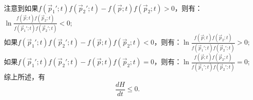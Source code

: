 \documentclass[reqno,a4paper,12pt]{amsart}
\begin{document}
\begin{enumerate}[1.]
\begin{tcolorbox}[breakable, colback = black!5!white, colframe = black]
\begin{align*}
\end{align*}
注意到如果$f(\vec{p}_1';t)f(\vec{p}_2';t) - f(\vec{p};t)f(\vec{p}_2;t)>0$，则有：$\ln \frac{f(\vec{p};t)f(\vec{p}_2;t)}{f(\vec{p}_1';t)f(\vec{p}_2';t)}<0$; \\
如果$f(\vec{p}_1';t)f(\vec{p}_2';t) - f(\vec{p};t)f(\vec{p}_2;t)<0$，则有：$\ln \frac{f(\vec{p};t)f(\vec{p}_2;t)}{f(\vec{p}_1';t)f(\vec{p}_2';t)}>0$; \\
如果$f(\vec{p}_1';t)f(\vec{p}_2';t) - f(\vec{p};t)f(\vec{p}_2;t)=0$，则有：$\ln \frac{f(\vec{p};t)f(\vec{p}_2;t)}{f(\vec{p}_1';t)f(\vec{p}_2';t)}=0$; \\
综上所述，有
\[
	\frac{dH}{dt} \leq 0.
\]
\end{tcolorbox}
\end{enumerate}
\end{document}

